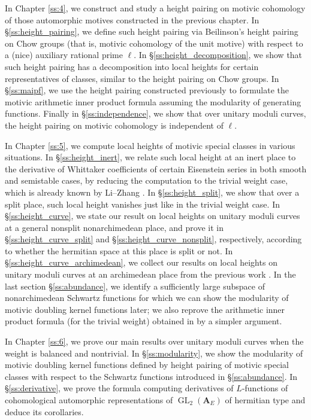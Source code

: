 \documentclass[12pt]{amsart}
\numberwithin{equation}{section}
\theoremstyle{plain}
\theoremstyle{definition}
\theoremstyle{remark}
\renewcommand{\b}[1]{\mathbf{#1}}
\renewcommand{\(}{\left(}
\renewcommand{\)}{\right)}
\newcommand{\bA}{\b A}
\DeclareMathOperator{\GL}{GL}
\begin{document}
In Chapter \ref{ss:4}, we construct and study a height pairing on motivic cohomology of those automorphic motives constructed in the previous chapter. In \S\ref{ss:height_pairing}, we define such height pairing via Beilinson's height pairing on Chow groups (that is, motivic cohomology of the unit motive) with respect to a (nice) auxiliary rational prime $\ell$. In \S\ref{ss:height_decomposition}, we show that such height pairing has a decomposition into local heights for certain representatives of classes, similar to the height pairing on Chow groups. In \S\ref{ss:maipf}, we use the height pairing constructed previously to formulate the motivic arithmetic inner product formula assuming the modularity of generating functions. Finally in \S\ref{ss:independence}, we show that over unitary moduli curves, the height pairing on motivic cohomology is independent of $\ell$.


In Chapter \ref{ss:5}, we compute local heights of motivic special classes in various situations. In \S\ref{ss:height_inert}, we relate such local height at an inert place to the derivative of Whittaker coefficients of certain Eisenstein series in both smooth and semistable cases, by reducing the computation to the trivial weight case, which is already known by Li--Zhang \cite{LZ22}. In \S\ref{ss:height_split}, we show that over a split place, such local height vanishes just like in the trivial weight case. In \S\ref{ss:height_curve}, we state our result on local heights on unitary moduli curves at a general nonsplit nonarchimedean place, and prove it in \S\ref{ss:height_curve_split} and \S\ref{ss:height_curve_nonsplit}, respectively, according to whether the hermitian space at this place is split or not. In \S\ref{ss:height_curve_archimedean}, we collect our results on local heights on unitary moduli curves at an archimedean place from the previous work \cite{Liu26}. In the last section \S\ref{ss:abundance}, we identify a sufficiently large subspace of nonarchimedean Schwartz functions for which we can show the modularity of motivic doubling kernel functions later; we also reprove the arithmetic inner product formula (for the trivial weight) obtained in \cite{Liu12} by a simpler argument.

In Chapter \ref{ss:6}, we prove our main results over unitary moduli curves when the weight is balanced and nontrivial. In \S\ref{ss:modularity}, we show the modularity of motivic doubling kernel functions defined by height pairing of motivic special classes with respect to the Schwartz functions introduced in \S\ref{ss:abundance}. In \S\ref{ss:derivative}, we prove the formula computing derivatives of $L$-functions of cohomological automorphic representations of $\GL_2(\bA_E)$ of hermitian type and deduce its corollaries.
\end{document}
